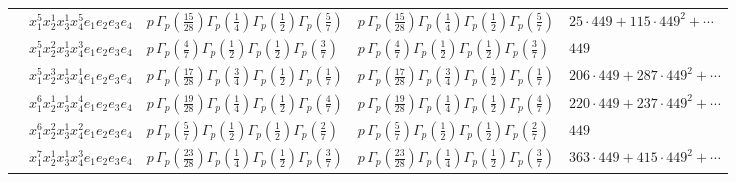 \documentclass[11pt]{article}
\begin{document}
\begin{table}[ht]
{\begin{tabular}{@{}lllll@{}}
 & $x_{1}^{5} x_{2}^{1} x_{3}^{1} x_{4}^{5}  e_{1} e_{2} e_{3} e_{4}$ & $p \, \Gamma_p \left( \frac{15}{28} \right) \Gamma_p \left( \frac{1}{4} \right) \Gamma_p \left( \frac{1}{2} \right) \Gamma_p \left( \frac{5}{7} \right)$ & $p \, \Gamma_p \left( \frac{15}{28} \right) \Gamma_p \left( \frac{1}{4} \right) \Gamma_p \left( \frac{1}{2} \right) \Gamma_p \left( \frac{5}{7} \right)$ & $25{\cdot}449{+}115{\cdot}449^{2}{+}\cdots$ \\
 & $x_{1}^{5} x_{2}^{2} x_{3}^{1} x_{4}^{3}  e_{1} e_{2} e_{3} e_{4}$ & $p \, \Gamma_p \left( \frac{4}{7} \right) \Gamma_p \left( \frac{1}{2} \right) \Gamma_p \left( \frac{1}{2} \right) \Gamma_p \left( \frac{3}{7} \right)$ & $p \, \Gamma_p \left( \frac{4}{7} \right) \Gamma_p \left( \frac{1}{2} \right) \Gamma_p \left( \frac{1}{2} \right) \Gamma_p \left( \frac{3}{7} \right)$ & $449$ \\
 & $x_{1}^{5} x_{2}^{3} x_{3}^{1} x_{4}^{1}  e_{1} e_{2} e_{3} e_{4}$ & $p \, \Gamma_p \left( \frac{17}{28} \right) \Gamma_p \left( \frac{3}{4} \right) \Gamma_p \left( \frac{1}{2} \right) \Gamma_p \left( \frac{1}{7} \right)$ & $p \, \Gamma_p \left( \frac{17}{28} \right) \Gamma_p \left( \frac{3}{4} \right) \Gamma_p \left( \frac{1}{2} \right) \Gamma_p \left( \frac{1}{7} \right)$ & $206{\cdot}449{+}287{\cdot}449^{2}{+}\cdots$ \\
 & $x_{1}^{6} x_{2}^{1} x_{3}^{1} x_{4}^{4}  e_{1} e_{2} e_{3} e_{4}$ & $p \, \Gamma_p \left( \frac{19}{28} \right) \Gamma_p \left( \frac{1}{4} \right) \Gamma_p \left( \frac{1}{2} \right) \Gamma_p \left( \frac{4}{7} \right)$ & $p \, \Gamma_p \left( \frac{19}{28} \right) \Gamma_p \left( \frac{1}{4} \right) \Gamma_p \left( \frac{1}{2} \right) \Gamma_p \left( \frac{4}{7} \right)$ & $220{\cdot}449{+}237{\cdot}449^{2}{+}\cdots$ \\
 & $x_{1}^{6} x_{2}^{2} x_{3}^{1} x_{4}^{2}  e_{1} e_{2} e_{3} e_{4}$ & $p \, \Gamma_p \left( \frac{5}{7} \right) \Gamma_p \left( \frac{1}{2} \right) \Gamma_p \left( \frac{1}{2} \right) \Gamma_p \left( \frac{2}{7} \right)$ & $p \, \Gamma_p \left( \frac{5}{7} \right) \Gamma_p \left( \frac{1}{2} \right) \Gamma_p \left( \frac{1}{2} \right) \Gamma_p \left( \frac{2}{7} \right)$ & $449$ \\
 & $x_{1}^{7} x_{2}^{1} x_{3}^{1} x_{4}^{3}  e_{1} e_{2} e_{3} e_{4}$ & $p \, \Gamma_p \left( \frac{23}{28} \right) \Gamma_p \left( \frac{1}{4} \right) \Gamma_p \left( \frac{1}{2} \right) \Gamma_p \left( \frac{3}{7} \right)$ & $p \, \Gamma_p \left( \frac{23}{28} \right) \Gamma_p \left( \frac{1}{4} \right) \Gamma_p \left( \frac{1}{2} \right) \Gamma_p \left( \frac{3}{7} \right)$ & $363{\cdot}449{+}415{\cdot}449^{2}{+}\cdots$ \\

\end{tabular}}
\end{table}
\end{document}
